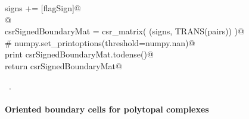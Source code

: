\documentclass[11pt,oneside]{article}	%
\begin{document}
\begin{flushleft}
\begin{list}{}{}
\mbox{}\verb@      signs += [flagSign]@\\
\mbox{}\verb@   @\\
\mbox{}\verb@   csrSignedBoundaryMat = csr_matrix( (signs, TRANS(pairs)) )@\\
\mbox{}\verb@   # numpy.set_printoptions(threshold=numpy.nan)@\\
\mbox{}\verb@   print csrSignedBoundaryMat.todense()@\\
\mbox{}\verb@   return csrSignedBoundaryMat@\\
\mbox{}\verb@@{\NWsep}
\end{list}
\vspace{-1ex}
\footnotesize\addtolength{\baselineskip}{-1ex}
\begin{list}{}{\setlength{\itemsep}{-\parsep}\setlength{\itemindent}{-\leftmargin}}
\item \NWtxtMacroRefIn\ .
\end{list}
\end{flushleft}

\paragraph{Oriented boundary cells for polytopal complexes}
\end{document}
